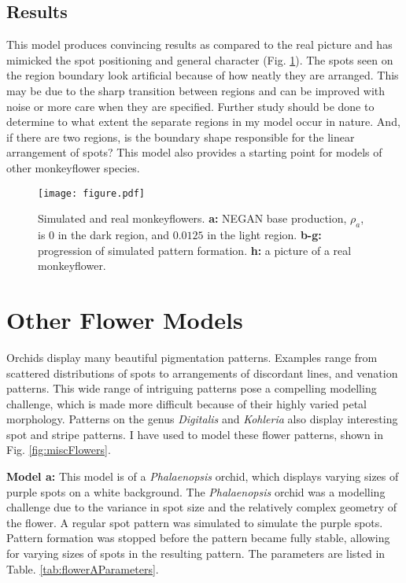 \subsection*{Results}
This model produces convincing results as compared to the real picture and has mimicked the spot positioning and general character (Fig. \ref{fig:monkeyflower}). The spots seen on the region boundary look artificial because of how neatly they are arranged. This may be due to the sharp transition between regions and can be improved with noise or more care when they are specified. Further study should be done to determine to what extent the separate regions in my model occur in nature. And, if there are two regions, is the boundary shape responsible for the linear arrangement of spots? This model also provides a starting point for models of other monkeyflower species.

\begin{figure}[ht]
	\centering
	\texttt{[image: figure.pdf]}
	\caption[Simulated and real monkeyflowers]{Simulated and real monkeyflowers. \textbf{a:} NEGAN base production, $\rho_a$, is 0 in the dark region, and $0.0125$ in the light region. \textbf{b-g:} progression of simulated pattern formation. \textbf{h:} a picture of a real monkeyflower.}
	\label{fig:monkeyflower}
\end{figure}

\section{Other Flower Models}
Orchids display many beautiful pigmentation patterns. Examples range from scattered distributions of spots to arrangements of discordant lines, and venation patterns. This wide range of intriguing patterns pose a compelling modelling challenge, which is made more difficult because of their highly varied petal morphology. Patterns on the genus \textit{Digitalis} and \textit{Kohleria} also display interesting spot and stripe patterns. I have used \ProgramName{} to model these flower patterns, shown in Fig. \ref{fig:miscFlowers}.

\textbf{Model a:} 
This model is of a \textit{Phalaenopsis} orchid, which displays varying sizes of purple spots on a white background. The \textit{Phalaenopsis} orchid was a modelling challenge due to the variance in spot size and the relatively complex geometry of the flower. A regular spot pattern was simulated to simulate the purple spots. Pattern formation was stopped before the pattern became fully stable, allowing for varying sizes of spots in the resulting pattern. The parameters are listed in Table. \ref{tab:flowerAParameters}.

